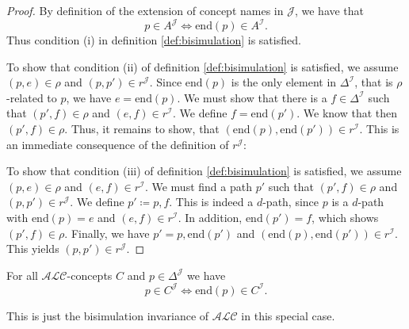 \begin{proof}
	By definition of the extension of concept names in $\mathcal{J}$, we have that
	\[
		p \in A^{\mathcal{J}} \iff \text{end}(p) \in A^{\mathcal{I}}
	.\]
	Thus condition (i) in definition \ref{def:bisimulation} is satisfied.

	To show that condition (ii) of definition \ref{def:bisimulation} is satisfied, 
	we assume $(p,e) \in \rho$ and $(p,p') \in r^\mathcal{J}$.
	Since $\text{end}(p)$ is the only element in $\Delta^{\mathcal{I}}$, that is $\rho$-related to $p$,
	we have $e = \text{end}(p)$.
	We must show that there is a $f \in \Delta^{\mathcal{I}}$ such that $(p',f) \in \rho$ and $(e,f) \in r^{\mathcal{I}}$.
	We define $f = \text{end}(p')$.
	We know that then $(p',f) \in \rho$.
	Thus, it remains to show, that $(\text{end}(p),\text{end}(p')) \in r^{\mathcal{I}}$.
	This is an immediate consequence of the definition of $r^{\mathcal{J}}$:

	To show that condition (iii) of definition \ref{def:bisimulation} is satisfied,
	we assume $(p,e) \in \rho$ and $(e,f) \in r^{\mathcal{I}}$.
	We must find a path $p'$ such that $(p',f) \in \rho$ and $(p,p') \in r^{\mathcal{J}}$.
	We define $p' \coloneqq p,f$.
	This is indeed a $d$-path, since $p$ is a $d$-path with $\text{end}(p) = e$ 
	and $(e,f) \in r^{\mathcal{I}}$.
	In addition, $\text{end}(p') = f$, which shows $(p',f) \in \rho$.
	Finally, we have $p' = p,\text{end}(p')$ and $(\text{end}(p), \text{end}(p')) \in r^\mathcal{I}$.
	This yields $(p,p') \in r^\mathcal{J}$.
\end{proof}

\begin{prop}\label{prop:tree model invariance}
	For all $\mathcal{ALC}$-concepts $C$ and $p \in \Delta^{\mathcal{J}}$ we have
	\[
		p \in C^{\mathcal{J}} \iff \text{end}(p) \in C^{\mathcal{I}}
	.\]
\end{prop}
This is just the bisimulation invariance of $\mathcal{ALC}$ in this special case.

